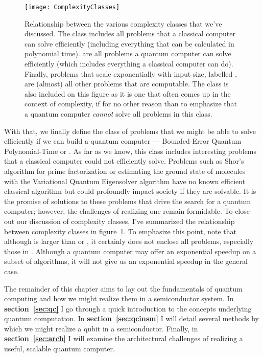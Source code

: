 \begin{figure}
  \texttt{[image: ComplexityClasses]}
  \caption[Relationship between various complexity classes]
  {Relationship between the various complexity classes that we've discussed. The class
   includes all problems that a classical computer can solve efficiently (including
  everything that can be calculated in polynomial time).  are all problems a quantum computer can
  solve efficiently (which includes everything a classical computer can do). Finally, problems that scale exponentially
  with input size, labelled , are (almost) all other problems that are computable. The class
   is also included on this figure as it is one that often comes up in the context of complexity,
  if for no other reason than to emphasize that a quantum computer \emph{cannot} solve all problems in
  this class.}
  \label{fig:complexity}
\end{figure}

With that, we finally define the class of problems that we might be able to solve efficiently if we
can build a quantum computer --- Bounded-Error Quantum Polynomial-Time or . As far as we know,
this class includes interesting problems that a classical computer could not efficiently solve. Problems
such as Shor's algorithm for prime factorization\cite{Shor} or estimating the ground state of molecules with
the Variational Quantum Eigensolver algorithm\cite{ncomms5213} have no known efficient classical algorithm
but could profoundly impact society if they are solvable. It is the promise of solutions to these problems
that drive the search for a quantum computer; however, the challenges of realizing one remain formidable. To close
out our discussion of complexity classes, I've summarized the relationship between complexity classes in
figure~\ref{fig:complexity}. To emphasize this point, note that although  is larger than 
or , it certainly does not enclose all problems, especially those in . Although a
quantum computer may offer an exponential speedup on a subset of algorithms, it will not give us an exponential
speedup in the general case.

The remainder of this chapter aims to lay out the fundamentals of quantum computing and how we might realize
them in a semiconductor system. In \textbf{section~\ref{sec:qc}} I go through a quick introduction to the concepts
underlying quantum computation. In \textbf{section~\ref{sec:qcinsm}} I will detail several methods by which we might
realize a qubit in a semiconductor. Finally, in \textbf{section~\ref{sec:arch}} I will examine the architectural
challenges of realizing a useful, scalable quantum computer.

